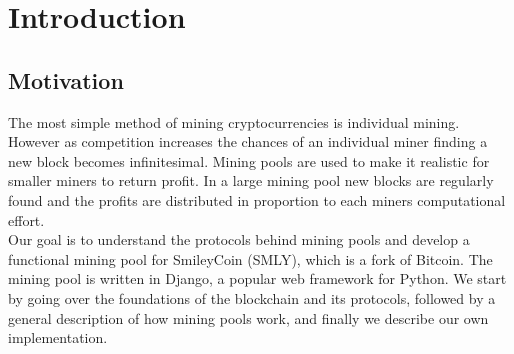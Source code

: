 \section{Introduction}
\subsection{Motivation}

The most simple method of mining cryptocurrencies is individual mining. However as competition increases the chances of an individual miner finding a new block becomes infinitesimal. Mining pools are used to make it realistic for smaller miners to return profit. In a large mining pool new blocks are regularly found and the profits are distributed in proportion to each miners computational effort. \\

Our goal is to understand the protocols behind mining pools and develop a functional mining pool for SmileyCoin (SMLY), which is a fork of Bitcoin. The mining pool is written in Django, a popular web framework for Python. We start by going over the foundations of the blockchain and its protocols, followed by a general description of how mining pools work, and finally we describe our own implementation.

\newpage